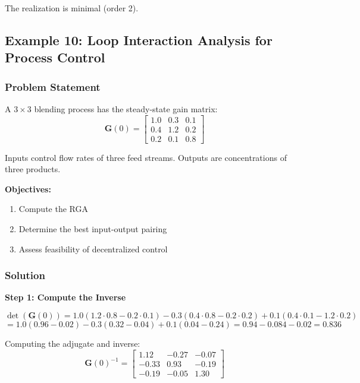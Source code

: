 The realization is minimal (order 2).


\subsection{Example 10: Loop Interaction Analysis for Process Control}

\subsubsection{Problem Statement}

A $3 \times 3$ blending process has the steady-state gain matrix:
\begin{equation}
\mathbf{G}(0) = \begin{bmatrix} 1.0 & 0.3 & 0.1 \\ 0.4 & 1.2 & 0.2 \\ 0.2 & 0.1 & 0.8 \end{bmatrix}
\end{equation}

Inputs control flow rates of three feed streams. Outputs are concentrations of three products.

\textbf{Objectives:}
\begin{enumerate}
\item Compute the RGA
\item Determine the best input-output pairing
\item Assess feasibility of decentralized control
\end{enumerate}

\subsubsection{Solution}

\textbf{Step 1: Compute the Inverse}

\begin{equation}
\det(\mathbf{G}(0)) = 1.0(1.2 \cdot 0.8 - 0.2 \cdot 0.1) - 0.3(0.4 \cdot 0.8 - 0.2 \cdot 0.2) + 0.1(0.4 \cdot 0.1 - 1.2 \cdot 0.2)
\end{equation}
\begin{equation}
= 1.0(0.96 - 0.02) - 0.3(0.32 - 0.04) + 0.1(0.04 - 0.24) = 0.94 - 0.084 - 0.02 = 0.836
\end{equation}

Computing the adjugate and inverse:
\begin{equation}
\mathbf{G}(0)^{-1} = \begin{bmatrix} 1.12 & -0.27 & -0.07 \\ -0.33 & 0.93 & -0.19 \\ -0.19 & -0.05 & 1.30 \end{bmatrix}
\end{equation}

